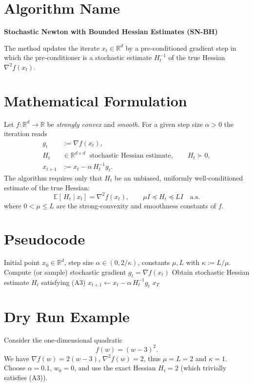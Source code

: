 \documentclass{article}
\newcommand{\E}{\mathbb{E}}
\newcommand{\R}{\mathbb{R}}
\begin{document}
\section*{Algorithm Name}
\textbf{Stochastic Newton with Bounded Hessian Estimates (SN-BH)}  

The method updates the iterate $x_t\in\R^{d}$ by a pre‑conditioned gradient step in which the pre‑conditioner is a stochastic estimate $H_t^{-1}$ of the true Hessian $\nabla^{2}f(x_t)$.  

\section*{Mathematical Formulation}
Let $f:\R^{d}\rightarrow\R$ be \emph{strongly convex} and \emph{smooth}.  
For a given step size $\alpha>0$ the iteration reads
\begin{align}
   g_t &:= \nabla f(x_t) , \label{eq:grad}\\
   H_t &\in\R^{d\times d}\ \text{ stochastic Hessian estimate},\qquad 
          H_t \succ 0, \label{eq:hessian}\\
   x_{t+1} &:= x_t - \alpha\, H_t^{-1} g_t . \label{eq:update}
\end{align}
The algorithm requires only that $H_t$ be an unbiased, uniformly well‑conditioned
estimate of the true Hessian:
\[
   \E\!\left[\,H_t\mid x_t\right]=\nabla^{2}f(x_t),\qquad
   \mu I \preceq H_t \preceq L I\quad\text{a.s.} \tag{A3}
\]
where $0<\mu\le L$ are the strong‑convexity and smoothness constants of $f$.

\section*{Pseudocode}
\begin{algorithm}[H]
\caption{SN‑BH}
\begin{algorithmic}[1]
\Require Initial point $x_0\in\R^{d}$, step size $\alpha\in(0,2/\kappa)$,
        constants $\mu,L$ with $\kappa:=L/\mu$.
    \State Compute (or sample) stochastic gradient $g_t=\nabla f(x_t)$
    \State Obtain stochastic Hessian estimate $H_t$ satisfying (A3)
    \State $x_{t+1}\gets x_t-\alpha\,H_t^{-1}g_t$
\EndFor
\State \Return $x_T$
\end{algorithmic}
\end{algorithm}

\section*{Dry Run Example}
Consider the one‑dimensional quadratic
\[
   f(w)=(w-3)^2.
\]
We have $\nabla f(w)=2(w-3)$, $\nabla^{2}f(w)=2$, thus $\mu=L=2$ and $\kappa=1$.  
Choose $\alpha=0.1$, $w_0=0$, and use the exact Hessian $H_t=2$ (which trivially satisfies (A3)).  
\end{document}
